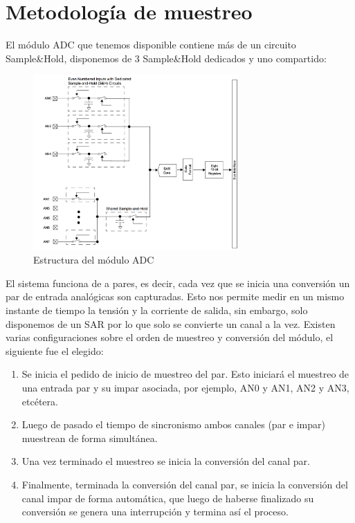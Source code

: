 \documentclass[12pt]{report}
\begin{document}
\section{Metodología de muestreo}

El módulo ADC que tenemos disponible contiene más de un circuito Sample\&Hold, disponemos de 3 Sample\&Hold dedicados y uno compartido:

\begin{figure}[H]
	\centering
	\includegraphics[width=0.7\textwidth,height=\textheight,keepaspectratio]{sh_diagram}
	\caption{Estructura del módulo ADC}
\end{figure}
	
El sistema funciona de a pares, es decir, cada vez que se inicia una conversión un par de entrada analógicas son capturadas. Esto nos permite medir en un mismo instante de tiempo la tensión y la corriente de salida, sin embargo, solo disponemos de un SAR por lo que solo se convierte un canal a la vez. Existen varias configuraciones sobre el orden de muestreo y conversión del módulo, el siguiente fue el elegido:

\begin{enumerate}
	\item Se inicia el pedido de inicio de muestreo del par. Esto iniciará el muestreo de una entrada par y su impar asociada, por ejemplo, AN0 y AN1, AN2 y AN3, etcétera.
	\item Luego de pasado el tiempo de sincronismo ambos canales (par e impar) muestrean de forma simultánea.
	\item Una vez terminado el muestreo se inicia la conversión del canal par.
	\item Finalmente, terminada la conversión del canal par, se inicia la conversión del canal impar de forma automática, que luego de haberse finalizado su conversión se genera una interrupción y termina así el proceso.
\end{enumerate}
\end{document}
